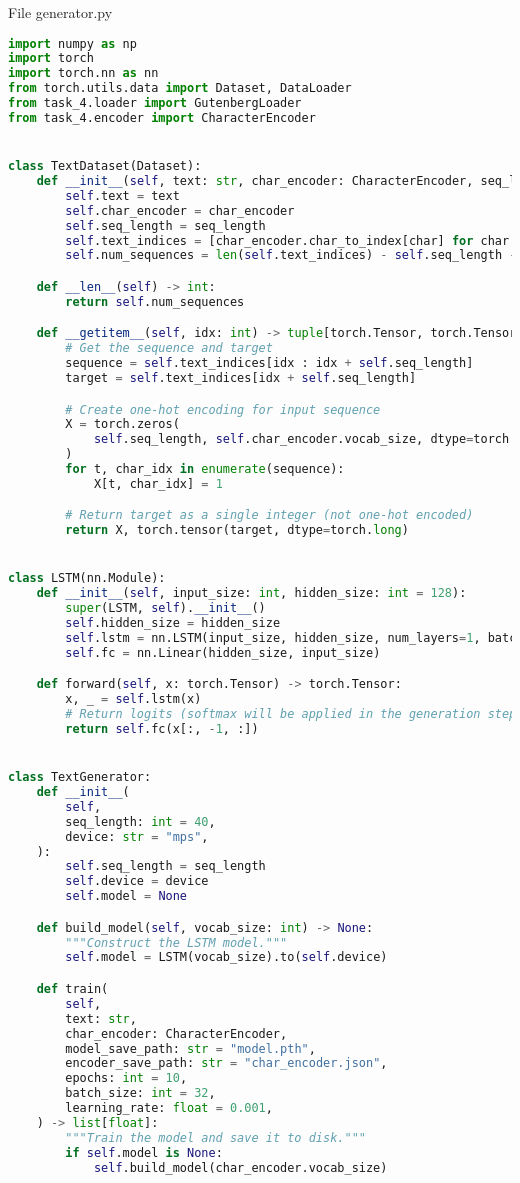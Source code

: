 \documentclass[12pt]{article}
\begin{document}
File generator.py
\begin{lstlisting}[language=Python]
import numpy as np
import torch
import torch.nn as nn
from torch.utils.data import Dataset, DataLoader
from task_4.loader import GutenbergLoader
from task_4.encoder import CharacterEncoder


class TextDataset(Dataset):
    def __init__(self, text: str, char_encoder: CharacterEncoder, seq_length: int):
        self.text = text
        self.char_encoder = char_encoder
        self.seq_length = seq_length
        self.text_indices = [char_encoder.char_to_index[char] for char in text]
        self.num_sequences = len(self.text_indices) - self.seq_length - 1

    def __len__(self) -> int:
        return self.num_sequences

    def __getitem__(self, idx: int) -> tuple[torch.Tensor, torch.Tensor]:
        # Get the sequence and target
        sequence = self.text_indices[idx : idx + self.seq_length]
        target = self.text_indices[idx + self.seq_length]

        # Create one-hot encoding for input sequence
        X = torch.zeros(
            self.seq_length, self.char_encoder.vocab_size, dtype=torch.float32
        )
        for t, char_idx in enumerate(sequence):
            X[t, char_idx] = 1

        # Return target as a single integer (not one-hot encoded)
        return X, torch.tensor(target, dtype=torch.long)


class LSTM(nn.Module):
    def __init__(self, input_size: int, hidden_size: int = 128):
        super(LSTM, self).__init__()
        self.hidden_size = hidden_size
        self.lstm = nn.LSTM(input_size, hidden_size, num_layers=1, batch_first=True)
        self.fc = nn.Linear(hidden_size, input_size)

    def forward(self, x: torch.Tensor) -> torch.Tensor:
        x, _ = self.lstm(x)
        # Return logits (softmax will be applied in the generation step)
        return self.fc(x[:, -1, :])


class TextGenerator:
    def __init__(
        self,
        seq_length: int = 40,
        device: str = "mps",
    ):
        self.seq_length = seq_length
        self.device = device
        self.model = None

    def build_model(self, vocab_size: int) -> None:
        """Construct the LSTM model."""
        self.model = LSTM(vocab_size).to(self.device)

    def train(
        self,
        text: str,
        char_encoder: CharacterEncoder,
        model_save_path: str = "model.pth",
        encoder_save_path: str = "char_encoder.json",
        epochs: int = 10,
        batch_size: int = 32,
        learning_rate: float = 0.001,
    ) -> list[float]:
        """Train the model and save it to disk."""
        if self.model is None:
            self.build_model(char_encoder.vocab_size)


\end{lstlisting}
\end{document}
